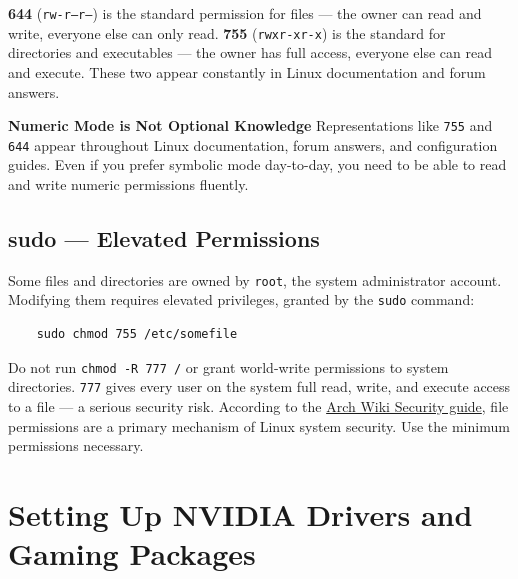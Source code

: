 \documentclass{article}
\newcommand{\code}[1]{\colorbox{codebg}{\texttt{#1}}}
\begin{document}
\begin{tcolorbox}[arc=12pt, outer arc=10pt,
	colback=blue!4!white, colframe=blue!40!black,
	title=\textbf{644 and 755 --- The Two You Will See Everywhere}]
	\textbf{644} (\code{rw-r--r--}) is the standard permission for files --- the
	owner can read and write, everyone else can only read. \textbf{755}
	(\code{rwxr-xr-x}) is the standard for directories and executables --- the
	owner has full access, everyone else can read and execute. These two appear
	constantly in Linux documentation and forum answers.
\end{tcolorbox}

\begin{callout}{\textbf{Numeric Mode is Not Optional Knowledge}}
	Representations like \code{755} and \code{644} appear throughout Linux
	documentation, forum answers, and configuration guides. Even if you prefer
	symbolic mode day-to-day, you need to be able to read and write numeric
	permissions fluently.
\end{callout}

\subsection{sudo --- Elevated Permissions}

Some files and directories are owned by \code{root}, the system administrator
account. Modifying them requires elevated privileges, granted by the \code{sudo}
command:

\begin{verbatim}
	sudo chmod 755 /etc/somefile
\end{verbatim}

\begin{tcolorbox}[arc=12pt, outer arc=10pt,
	colback=red!5!white, colframe=red!60!black,
	title=\textbf{Warning}]
	Do not run \code{chmod -R 777 /} or grant world-write permissions to system
	directories. \code{777} gives every user on the system full read, write, and
	execute access to a file --- a serious security risk. According to the
	\href{https://wiki.archlinux.org/title/Security}{Arch Wiki Security guide}, file
	permissions are a primary mechanism of Linux system security. Use the minimum
	permissions necessary.
\end{tcolorbox}

\newpage
\section{Setting Up NVIDIA Drivers and Gaming Packages}
\label{sec:nvidia}
\end{document}
